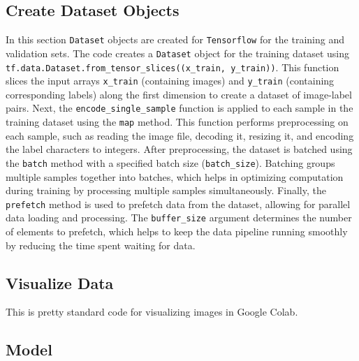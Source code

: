 \documentclass[10pt,twocolumn]{article}
\begin{document}
\subsection{Create Dataset Objects}
In this section \texttt{Dataset} objects are created for \texttt{Tensorflow} for the training and validation sets. The code creates a \texttt{Dataset} object for the training dataset using \texttt{tf.data.Dataset.from\_tensor\_slices((x\_train, y\_train))}. This function slices the input arrays \texttt{x\_train} (containing images) and \texttt{y\_train} (containing corresponding labels) along the first dimension to create a dataset of image-label pairs. Next, the \texttt{encode\_single\_sample} function is applied to each sample in the training dataset using the \texttt{map} method. This function performs preprocessing on each sample, such as reading the image file, decoding it, resizing it, and encoding the label characters to integers. After preprocessing, the dataset is batched using the \texttt{batch} method with a specified batch size (\texttt{batch\_size}). Batching groups multiple samples together into batches, which helps in optimizing computation during training by processing multiple samples simultaneously. Finally, the \texttt{prefetch} method is used to prefetch data from the dataset, allowing for parallel data loading and processing. The \texttt{buffer\_size} argument determines the number of elements to prefetch, which helps to keep the data pipeline running smoothly by reducing the time spent waiting for data.


\subsection{Visualize Data}

This is pretty standard code for visualizing images in Google Colab.


\subsection{Model}
\end{document}
